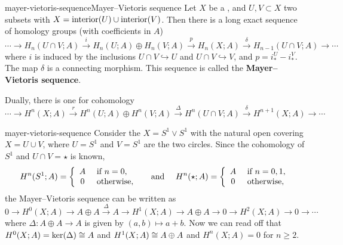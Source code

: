 \begin{topic}{mayer-vietoris-sequence}{Mayer–Vietoris sequence}
    Let $X$ be a , and $U, V \subset X$ two subsets with $X = \textup{interior}(U) \cup \textup{interior}(V)$. Then there is a long exact sequence of homology groups (with coefficients in $A$)
    \[ \cdots \longrightarrow H_n(U \cap V; A) \overset{i}{\longrightarrow} H_n(U; A) \oplus H_n(V; A) \overset{p}{\longrightarrow} H_n(X; A) \overset{\delta}{\longrightarrow} H_{n - 1}(U \cap V; A) \longrightarrow \cdots \]
    where $i$ is induced by the inclusions $U \cap V \hookrightarrow U$ and $U \cap V \hookrightarrow V$, and $p = i_*^U - i_*^V$. The map $\delta$ is a connecting morphism. This sequence is called the \textbf{Mayer--Vietoris sequence}.
    
    Dually, there is one for cohomology
    \[ \cdots \longrightarrow H^n(X; A) \overset{r}{\longrightarrow} H^n(U; A) \oplus H^n(V; A) \overset{\Delta}{\longrightarrow} H^n(U \cap V; A) \overset{\delta}{\longrightarrow} H^{n + 1}(X; A) \longrightarrow \cdots \]
\end{topic}

\begin{example}{mayer-vietoris-sequence}
    Consider the  $X = S^1 \vee S^1$ with the natural open covering $X = U \cup V$, where $U = S^1$ and $V = S^1$ are the two circles. Since the cohomology of $S^1$ and $U \cap V = \star$ is known,
    \[ H^n(S^1; A) = \left\{ \begin{array}{cl} A & \textup{ if } n = 0, \\ 0 & \textup{ otherwise}, \end{array} \right. \quad \textup{ and } \quad H^n(\star; A) = \left\{ \begin{array}{cl} A & \textup{ if } n = 0, 1, \\ 0 & \textup{ otherwise}, \end{array} \right. \]
    the Mayer--Vietoris sequence can be written as
    \[ 0 \to H^0(X; A) \to A \oplus A \xrightarrow{\Delta} A \to H^1(X; A) \to A \oplus A \to 0 \to H^2(X; A) \to 0 \to \cdots \]
    where $\Delta : A \oplus A \to A$ is given by $(a, b) \mapsto a + b$. Now we can read off that $H^0(X; A) = \ker(\Delta) \cong A$ and $H^1(X; A) \cong A \oplus A$ and $H^n(X; A) = 0$ for $n \ge 2$.
\end{example}

